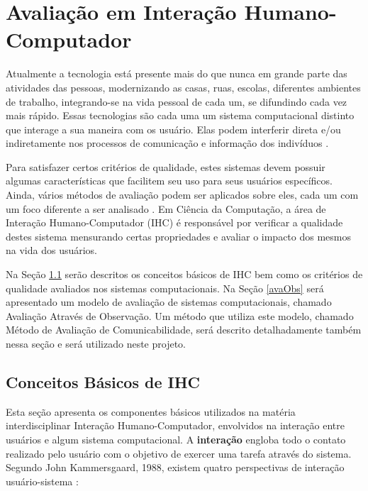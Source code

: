 \chapter{Avaliação em Interação Humano-Computador}

\indent Atualmente a tecnologia está presente mais do que nunca em grande parte das atividades das pessoas, modernizando as casas, ruas, escolas, diferentes ambientes de trabalho, integrando-se na vida pessoal de cada um, se difundindo cada vez mais rápido. Essas tecnologias são cada uma um sistema computacional distinto que interage a sua maneira com os usuário. Elas podem interferir direta e/ou indiretamente nos processos de comunicação e informação dos indivíduos \cite{tics}. 

\indent Para satisfazer certos critérios de qualidade, estes sistemas devem possuir algumas características que facilitem seu uso para seus usuários específicos. Ainda, vários métodos de avaliação podem ser aplicados sobre eles, cada um com um foco diferente a ser analisado \cite{IHCbook}. Em Ciência da Computação, a área de Interação Humano-Computador (IHC) é responsável por verificar a qualidade destes sistema mensurando certas propriedades e avaliar o impacto dos mesmos na vida dos usuários. 

\indent Na Seção \ref{cbIHC} serão descritos os conceitos básicos de IHC bem como os critérios de qualidade avaliados nos sistemas computacionais. Na Seção \ref{avaObs} será apresentado um modelo de avaliação de sistemas computacionais, chamado Avaliação Através de Observação. Um método que utiliza este modelo, chamado Método de Avaliação de Comunicabilidade, será descrito detalhadamente também nessa seção e será utilizado neste projeto.
 
\section{Conceitos Básicos de IHC} \label{cbIHC}

\indent Esta seção apresenta os componentes básicos utilizados na matéria interdisciplinar Interação Humano-Computador, envolvidos na interação entre usuários e algum sistema computacional. A \textbf{interação} engloba todo o contato realizado pelo usuário com o objetivo de exercer uma tarefa através do sistema. Segundo John Kammersgaard, 1988, existem quatro perspectivas de interação usuário-sistema \cite{IHCbook}:

